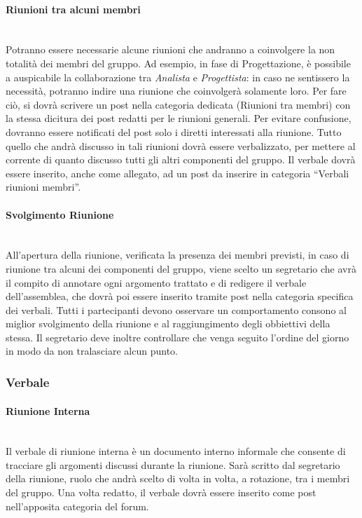 \paragraph{Riunioni tra alcuni membri}\mbox{}\\
Potranno essere necessarie alcune riunioni che andranno a coinvolgere la non totalità dei membri del gruppo. Ad esempio, in fase di Progettazione, è possibile a auspicabile la collaborazione tra \textit{Analista} e \textit{Progettista}: in caso ne sentissero la necessità, potranno indire una riunione che coinvolgerà solamente loro. Per fare ciò, si dovrà scrivere un post nella categoria dedicata (Riunioni tra membri) con la stessa dicitura dei post redatti per le riunioni generali. Per evitare confusione, dovranno essere notificati del post solo i diretti interessati alla riunione. Tutto quello che andrà discusso in tali riunioni dovrà essere verbalizzato, per mettere al corrente di quanto discusso tutti gli altri componenti del gruppo. Il verbale dovrà essere inserito, anche come allegato, ad un post da inserire in categoria “Verbali riunioni membri”.

\paragraph{Svolgimento Riunione}\mbox{}\\
All'apertura della riunione, verificata la presenza dei membri previsti, in caso di riunione tra alcuni dei componenti del gruppo, viene scelto un
segretario che avrà il compito di annotare ogni argomento trattato e di redigere il verbale
dell'assemblea, che dovrà poi essere inserito tramite post nella categoria specifica dei verbali. Tutti i partecipanti devono osservare un comportamento consono al miglior svolgimento
della riunione e al raggiungimento degli obbiettivi della stessa. Il segretario deve inoltre
controllare che venga seguito l'ordine del giorno in modo da non tralasciare alcun punto.

\subsubsection{Verbale}
\paragraph{Riunione Interna}\mbox{}\\
Il verbale di riunione interna è un documento interno informale che consente di tracciare gli argomenti discussi durante la riunione. Sarà scritto dal segretario della riunione, ruolo che andrà scelto di volta in volta, a rotazione, tra i membri del gruppo. Una volta redatto, il verbale dovrà essere inserito come post nell'apposita categoria del forum.


